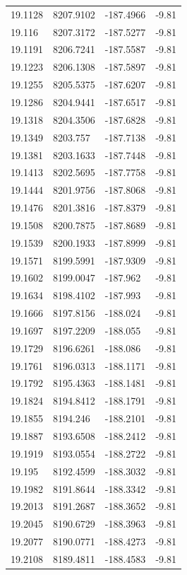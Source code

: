 \begin{table}[H]
\begin{tabular}{llll}
19.1128 & 8207.9102 & -187.4966 & -9.81 \\
19.116 & 8207.3172 & -187.5277 & -9.81 \\
19.1191 & 8206.7241 & -187.5587 & -9.81 \\
19.1223 & 8206.1308 & -187.5897 & -9.81 \\
19.1255 & 8205.5375 & -187.6207 & -9.81 \\
19.1286 & 8204.9441 & -187.6517 & -9.81 \\
19.1318 & 8204.3506 & -187.6828 & -9.81 \\
19.1349 & 8203.757 & -187.7138 & -9.81 \\
19.1381 & 8203.1633 & -187.7448 & -9.81 \\
19.1413 & 8202.5695 & -187.7758 & -9.81 \\
19.1444 & 8201.9756 & -187.8068 & -9.81 \\
19.1476 & 8201.3816 & -187.8379 & -9.81 \\
19.1508 & 8200.7875 & -187.8689 & -9.81 \\
19.1539 & 8200.1933 & -187.8999 & -9.81 \\
19.1571 & 8199.5991 & -187.9309 & -9.81 \\
19.1602 & 8199.0047 & -187.962 & -9.81 \\
19.1634 & 8198.4102 & -187.993 & -9.81 \\
19.1666 & 8197.8156 & -188.024 & -9.81 \\
19.1697 & 8197.2209 & -188.055 & -9.81 \\
19.1729 & 8196.6261 & -188.086 & -9.81 \\
19.1761 & 8196.0313 & -188.1171 & -9.81 \\
19.1792 & 8195.4363 & -188.1481 & -9.81 \\
19.1824 & 8194.8412 & -188.1791 & -9.81 \\
19.1855 & 8194.246 & -188.2101 & -9.81 \\
19.1887 & 8193.6508 & -188.2412 & -9.81 \\
19.1919 & 8193.0554 & -188.2722 & -9.81 \\
19.195 & 8192.4599 & -188.3032 & -9.81 \\
19.1982 & 8191.8644 & -188.3342 & -9.81 \\
19.2013 & 8191.2687 & -188.3652 & -9.81 \\
19.2045 & 8190.6729 & -188.3963 & -9.81 \\
19.2077 & 8190.0771 & -188.4273 & -9.81 \\
19.2108 & 8189.4811 & -188.4583 & -9.81 \\

\end{tabular}
\end{table}
